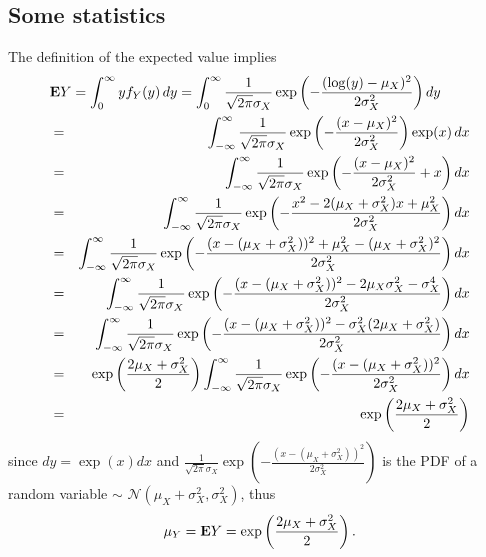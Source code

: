 \subsection{Some statistics}

The definition of the expected value implies
\begin{eqnarray*}
\lefteqn{
\Expect Y = \int_{0}^{\infty} y f_Y(y) \, dy
= \int_{0}^{\infty} \frac{1}{\sqrt{2\pi} \sigma_X }  \exp\left(-\frac{(\log(y)-\mu_X)^2}{2\sigma_X^2}\right) dy
}
\\
&=&
\int_{-\infty}^{\infty} \frac{1}{\sqrt{2\pi} \sigma_X }  \exp\left(-\frac{(x-\mu_X)^2}{2\sigma_X^2}\right) \exp(x) \, dx
\\
&=&
\int_{-\infty}^{\infty} \frac{1}{\sqrt{2\pi} \sigma_X }  \exp\left(-\frac{(x-\mu_X)^2}{2\sigma_X^2}+x\right) dx
\\
&=&
\int_{-\infty}^{\infty} \frac{1}{\sqrt{2\pi} \sigma_X }  \exp\left(-\frac{x^2 - 2(\mu_X +\sigma_X^2)x + \mu_X^2}{2\sigma_X^2}\right) dx
\\
&=&
\int_{-\infty}^{\infty} \frac{1}{\sqrt{2\pi} \sigma_X }  \exp\left(-\frac{(x - (\mu_X +\sigma_X^2))^2 + \mu_X^2 -(\mu_X+\sigma_X^2)^2}{2\sigma_X^2}\right) dx
\\
&=&
\int_{-\infty}^{\infty} \frac{1}{\sqrt{2\pi} \sigma_X }  \exp\left(-\frac{(x - (\mu_X +\sigma_X^2))^2 - 2\mu_X\sigma_X^2 - \sigma_X^4}{2\sigma_X^2}\right) dx
\\
&=&
\int_{-\infty}^{\infty} \frac{1}{\sqrt{2\pi} \sigma_X }  \exp\left(-\frac{(x - (\mu_X +\sigma_X^2))^2 - \sigma_X^2(2\mu_X+ \sigma_X^2)}{2\sigma_X^2}\right) dx
\\
&=&
\exp\left(\frac{2\mu_X+ \sigma_X^2}{2}\right)
\int_{-\infty}^{\infty} \frac{1}{\sqrt{2\pi} \sigma_X }  \exp\left(-\frac{(x - (\mu_X +\sigma_X^2))^2 }{2\sigma_X^2}\right) dx
\\
&=&
\exp\left(\frac{2\mu_X+ \sigma_X^2}{2}\right)
\end{eqnarray*}
since $dy = \exp(x) dx$
and $\frac{1}{\sqrt{2\pi} \sigma_X }  \exp\left(-\frac{(x - (\mu_X +\sigma_X^2))^2 }{2\sigma_X^2}\right)$
is the PDF of a random variable $\sim$ $\mathcal{N}(\mu_X+\sigma_X^2,\sigma_X^2)$,
thus
\begin{equation}
\label{eq:log-normal-mean}
\mu_Y
= \mathbf{E} Y = \exp\left(\frac{2\mu_X+ \sigma_X^2}{2}\right).
\end{equation}

